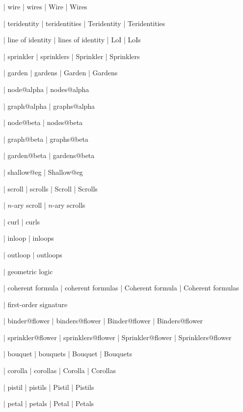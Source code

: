  | wire
 | wires
 | Wire
 | Wires

 | teridentity
 | teridentities
 | Teridentity
 | Teridentities

 | line of identity
 | lines of identity
 | LoI
 | LoIs

 | sprinkler
 | sprinklers
 | Sprinkler
 | Sprinklers

 | garden
 | gardens
 | Garden
 | Gardens

 | node@alpha
 | nodes@alpha

 | graph@alpha
 | graphs@alpha

 | node@beta
 | nodes@beta

 | graph@beta
 | graphs@beta

 | garden@beta
 | gardens@beta

 | shallow@eg
 | Shallow@eg


 | scroll
 | scrolls
 | Scroll
 | Scrolls

 | $n$-ary scroll
 | $n$-ary scrolls

 | curl
 | curls

 | inloop
 | inloops

 | outloop
 | outloops

 | geometric logic

 | coherent formula
 | coherent formulas
 | Coherent formula
 | Coherent formulas

 | first-order signature

 | binder@flower
 | binders@flower
 | Binder@flower
 | Binders@flower

 | sprinkler@flower
 | sprinklers@flower
 | Sprinkler@flower
 | Sprinklers@flower

 | bouquet
 | bouquets
 | Bouquet
 | Bouquets

 | corolla
 | corollas
 | Corolla
 | Corollas

 | pistil
 | pistils
 | Pistil
 | Pistils

 | petal
 | petals
 | Petal
 | Petals

